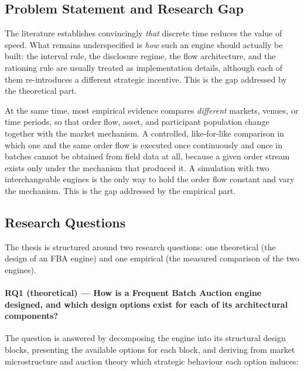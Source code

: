 \documentclass[11pt]{article}
\begin{document}
\subsection{Problem Statement and Research Gap}

The literature establishes convincingly \emph{that} discrete time reduces the value of speed. What remains underspecified is \emph{how} such an engine should actually be built: the interval rule, the disclosure regime, the flow architecture, and the rationing rule are usually treated as implementation details, although each of them re-introduces a different strategic incentive. This is the gap addressed by the theoretical part.

At the same time, most empirical evidence compares \emph{different} markets, venues, or time periods, so that order flow, asset, and participant population change together with the market mechanism. A controlled, like-for-like comparison in which one and the same order flow is executed once continuously and once in batches cannot be obtained from field data at all, because a given order stream exists only under the mechanism that produced it. A simulation with two interchangeable engines is the only way to hold the order flow constant and vary the mechanism. This is the gap addressed by the empirical part.

\subsection{Research Questions}

The thesis is structured around two research questions: one theoretical (the design of an FBA engine) and one empirical (the measured comparison of the two engines).

\paragraph{RQ1 (theoretical) --- How is a Frequent Batch Auction engine designed, and which design options exist for each of its architectural components?}

The question is answered by decomposing the engine into its structural design blocks, presenting the available options for each block, and deriving from market microstructure and auction theory which strategic behaviour each option induces:
\end{document}
